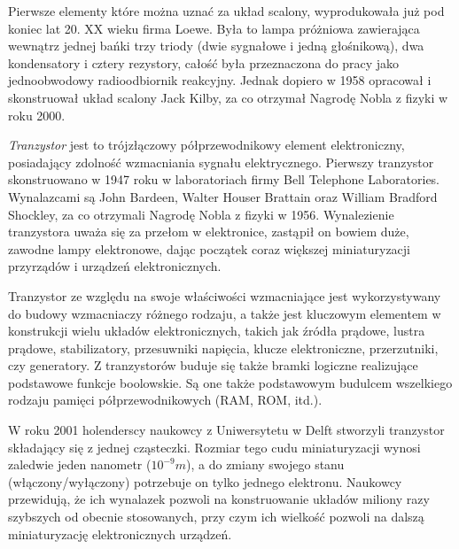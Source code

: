 \documentclass[a4paper,11pt]{article}
\begin{document}
       Pierwsze elementy które można uznać za układ scalony, wyprodukowała już pod koniec lat 20. XX wieku firma Loewe. Była to lampa próżniowa zawierająca wewnątrz jednej bańki trzy triody (dwie sygnałowe i jedną głośnikową), dwa kondensatory i cztery rezystory, całość była przeznaczona do pracy jako jednoobwodowy radioodbiornik reakcyjny. Jednak dopiero w 1958 opracował i skonstruował układ scalony Jack Kilby, za co otrzymał Nagrodę Nobla z fizyki w roku 2000.
       
        \smallskip
        \emph{Tranzystor} jest to trójzłączowy półprzewodnikowy element elektroniczny, posiadający zdolność wzmacniania sygnału elektrycznego. 
        Pierwszy tranzystor skonstruowano w 1947 roku w laboratoriach firmy Bell Telephone Laboratories. Wynalazcami są John Bardeen, Walter Houser Brattain oraz William Bradford Shockley, za co otrzymali Nagrodę Nobla z fizyki w 1956. Wynalezienie tranzystora uważa się za przełom w elektronice, zastąpił on bowiem duże, zawodne lampy elektronowe, dając początek coraz większej miniaturyzacji przyrządów i urządzeń elektronicznych.
        
         Tranzystor ze względu na swoje właściwości wzmacniające jest  wykorzystywany do budowy wzmacniaczy różnego rodzaju, a także jest kluczowym elementem w konstrukcji wielu układów elektronicznych, takich jak źródła prądowe, lustra prądowe, stabilizatory, przesuwniki napięcia, klucze elektroniczne, przerzutniki, czy generatory. Z tranzystorów buduje się także bramki logiczne realizujące podstawowe funkcje boolowskie. Są one także podstawowym budulcem wszelkiego rodzaju pamięci półprzewodnikowych (RAM, ROM, itd.).
         
          W roku 2001 holenderscy naukowcy z Uniwersytetu w Delft stworzyli tranzystor składający się z jednej cząsteczki. Rozmiar tego cudu miniaturyzacji wynosi zaledwie jeden nanometr (\(10^{-9} m\)), a do zmiany swojego stanu (włączony/wyłączony) potrzebuje on tylko jednego elektronu. Naukowcy przewidują, że ich wynalazek pozwoli na konstruowanie układów miliony razy szybszych od obecnie stosowanych, przy czym ich wielkość pozwoli na dalszą miniaturyzację elektronicznych urządzeń. 
\end{document}
